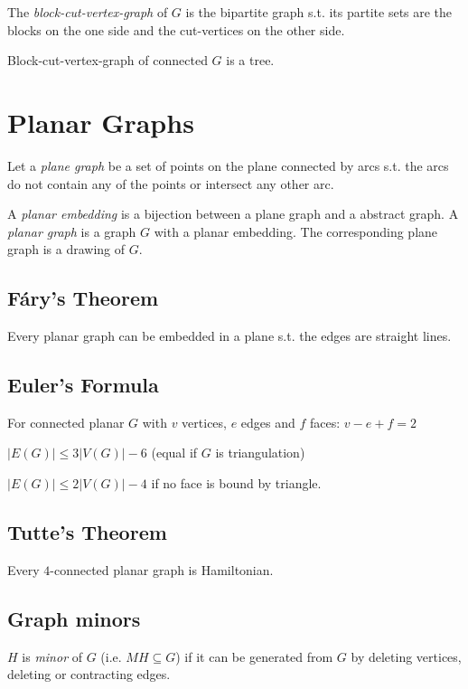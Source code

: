 The \emph{block-cut-vertex-graph} of $G$ is the bipartite graph s.t. its partite sets are the blocks on the one side and the cut-vertices on the other side.

Block-cut-vertex-graph of connected $G$ is a tree.

\section*{Planar Graphs}

Let a \emph{plane graph} be a set of points on the plane connected by arcs s.t. the arcs do not contain any of the points or intersect any other arc.

A \emph{planar embedding} is a bijection between a plane graph and a abstract graph.
A \emph{planar graph} is a graph $G$ with a planar embedding. The corresponding plane graph is a drawing of $G$.

\subsection*{F\'{a}ry's Theorem}

Every planar graph can be embedded in a plane s.t. the edges are straight lines.

\subsection*{Euler's Formula}

For connected planar $G$ with $v$ vertices, $e$ edges and $f$ faces: $v-e+f=2$

\spacing

$|E(G)| \leq 3|V(G)|-6$ (equal if $G$ is triangulation)

$|E(G)| \leq 2|V(G)|-4$ if no face is bound by triangle.

\subsection*{Tutte's Theorem}

Every $4$-connected planar graph is Hamiltonian.

\subsection*{Graph minors}

$H$ is \emph{minor} of $G$ (i.e. $MH \subseteq G$) if it can be generated from $G$ by deleting vertices, deleting or contracting edges.

